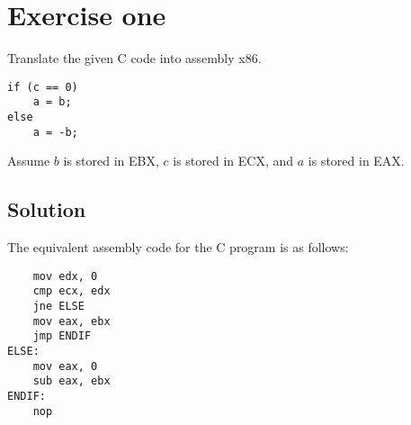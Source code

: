 \section{Exercise one}
Translate the given C code into assembly x86. 
\begin{verbatim}
if (c == 0)
    a = b;
else
    a = -b;
\end{verbatim}
Assume $b$ is stored in EBX, $c$ is stored in ECX, and $a$ is stored in EAX.

\subsection{Solution}
The equivalent assembly code for the C program is as follows:
\begin{verbatim}
    mov edx, 0
    cmp ecx, edx
    jne ELSE
    mov eax, ebx
    jmp ENDIF
ELSE:
    mov eax, 0
    sub eax, ebx
ENDIF:
    nop
\end{verbatim}